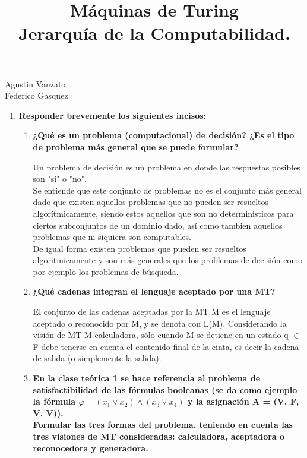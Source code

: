 \documentclass{article}
\title{Máquinas de Turing \\ Jerarquía de la Computabilidad.}
\begin{document}
\newenvironment{solution}{\begin{proof}[Solution]}{\end{proof}}
\maketitle

\large 

\begin{center}

{\Large Agustin Vanzato \\
Federico Gasquez} %
\end{center}
\vspace{0.05in}

\begin{enumerate}

\item \textbf{ Responder brevemente los siguientes incisos:}

\begin{enumerate}
\item \textbf{¿Qué es un problema (computacional) de decisión? ¿Es el tipo de problema más general que se puede formular?}

Un problema de decisión es un problema en donde las respuestas posibles son "sí" o "no".\\
Se entiende que este conjunto de problemas no es el conjunto más general dado que
existen aquellos problemas que no pueden ser resueltos algorítmicamente, siendo
estos aquellos que son no deterministicos para ciertos subconjuntos de un dominio
dado, así como tambien aquellos problemas que ni siquiera son computables.
\\De igual forma existen problemas que pueden ser resueltos algoritmicamente y son
más generales que los problemas de decisión como por ejemplo los problemas de
búsqueda.
\item \textbf{¿Qué cadenas integran el lenguaje aceptado por una MT?}

El conjunto de las cadenas aceptadas por la MT M es el lenguaje aceptado o reconocido por M, y se denota con L(M). Considerando la visión de
MT M calculadora, sólo cuando M se detiene en un estado q $\in$ F debe tenerse en cuenta
el contenido final de la cinta, es decir la cadena de salida (o simplemente la salida).
\item \textbf{En la clase teórica 1 se hace referencia al problema de satisfactibilidad de las fórmulas booleanas (se da como ejemplo la fórmula $\varphi = (x_1 \vee x_2) \wedge (x_3 \vee x_4)$ y la asignación A = (V, F, V, V)).\\ Formular las tres formas del problema, teniendo en cuenta las tres visiones de MT consideradas: calculadora, aceptadora o reconocedora y generadora.}



\end{enumerate}
\end{enumerate}
\end{document}
